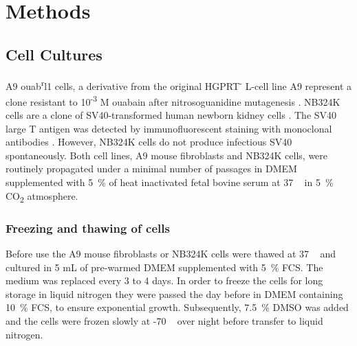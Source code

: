 
\chapter{Methods} %

\label{ChapterX} %



\section{Cell Cultures}
A9 ouab\textsuperscript{r}l1 cells, a derivative from the original HGPRT\textsuperscript{-} L-cell line A9 represent a clone resistant to 10\textsuperscript{-3} M ouabain after nitrosoguanidine mutagenesis \cite{pmid14213660}.
NB324K cells are a clone of SV40-transformed  human newborn kidney cells \cite{pmid13911591}. The SV40 large T antigen was detected by immunofluorescent  staining with monoclonal antibodies \cite{pmid6169844}.  However, NB324K cells do not produce infectious SV40 spontaneously.
Both cell lines, A9 mouse fibroblasts and NB324K cells, were routinely propagated under a minimal number of passages in DMEM supplemented with 5~\% of heat inactivated fetal bovine serum at 37 \textcelsius~ in 5~\% CO\textsubscript{2} atmosphere.  


\subsection{Freezing and thawing of cells}
Before use the A9 mouse fibroblasts or NB324K cells were thawed at 37 \textcelsius~ and cultured in 5 mL of pre-warmed DMEM supplemented with 5~\% FCS. The medium was replaced every 3 to 4 days. 
In order to freeze the cells for long storage in liquid nitrogen they were passed the day before in DMEM containing 10~\% FCS, to ensure exponential growth. Subsequently, 7.5~\% DMSO was added and the cells were frozen slowly at -70 \textcelsius~ over night before transfer to liquid nitrogen.

